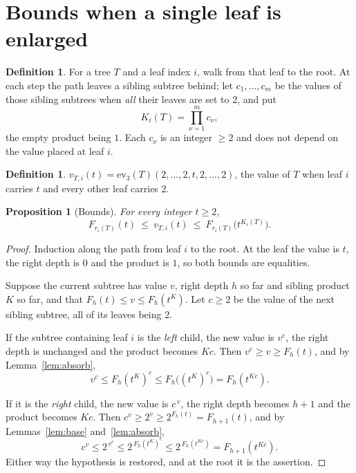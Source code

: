 \documentclass[11pt,a4paper]{article}
\theoremstyle{plain}
\newtheorem{proposition}[theorem]{Proposition}
\theoremstyle{definition}
\newtheorem{definition}[theorem]{Definition}
\newcommand{\ev}{\mathrm{ev}}
\begin{document}
\section{Bounds when a single leaf is enlarged}\label{sec:bounds}

\begin{definition}\label{def:K}
For a tree $T$ and a leaf index $i$, walk from that leaf to the root. At each step the
path leaves a sibling subtree behind; let $c_1,\dots,c_m$ be the values of those sibling
subtrees when \emph{all} their leaves are set to $2$, and put
\[
  K_i(T)=\prod_{\nu=1}^{m}c_\nu ,
\]
the empty product being $1$. Each $c_\nu$ is an integer $\ge2$ and does not depend on the
value placed at leaf $i$.
\end{definition}

\begin{definition}\label{def:vTi}
$v_{T,i}(t)=\ev_3(T)(2,\dots,2,t,2,\dots,2)$, the value of $T$ when leaf $i$ carries $t$
and every other leaf carries $2$.
\end{definition}

\begin{proposition}[Bounds]\label{prop:bounds}
For every integer $t\ge2$,
\[
  F_{r_i(T)}(t)\ \le\ v_{T,i}(t)\ \le\ F_{r_i(T)}\bigl(t^{K_i(T)}\bigr).
\]
\end{proposition}

\begin{proof}
Induction along the path from leaf $i$ to the root. At the leaf the value is $t$, the
right depth is $0$ and the product is $1$, so both bounds are equalities.

Suppose the current subtree has value $v$, right depth $h$ so far and sibling product
$K$ so far, and that $F_h(t)\le v\le F_h(t^{K})$. Let $c\ge2$ be the value of the next
sibling subtree, all of its leaves being $2$.

If the subtree containing leaf $i$ is the \emph{left} child, the new value is $v^{c}$,
the right depth is unchanged and the product becomes $Kc$. Then
$v^{c}\ge v\ge F_h(t)$, and by Lemma~\ref{lem:absorb},
\[
  v^{c}\le F_h(t^{K})^{c}\le F_h\bigl((t^{K})^{c}\bigr)=F_h(t^{Kc}).
\]

If it is the \emph{right} child, the new value is $c^{\,v}$, the right depth becomes
$h+1$ and the product becomes $Kc$. Then $c^{v}\ge2^{v}\ge2^{F_h(t)}=F_{h+1}(t)$, and by
Lemmas~\ref{lem:base} and~\ref{lem:absorb},
\[
  c^{v}\le2^{\,v^{c}}\le2^{\,F_h(t^{K})^{c}}\le2^{\,F_h(t^{Kc})}=F_{h+1}(t^{Kc}).
\]
Either way the hypothesis is restored, and at the root it is the assertion.
\end{proof}
\end{document}
